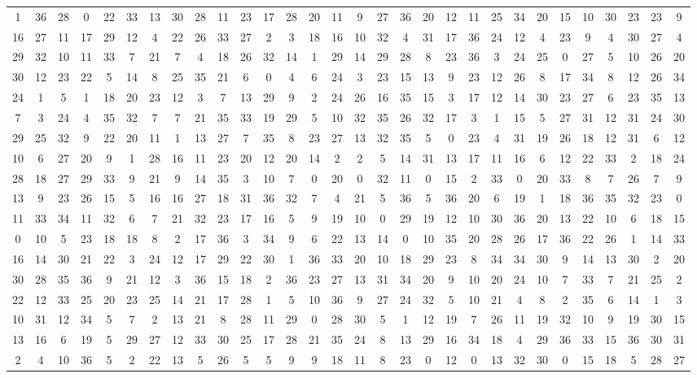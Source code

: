 \documentclass[11pt,twoside]{article}
\numberwithin{Theorem}{section}
\numberwithin{Definition}{section}
\numberwithin{Lemma}{section}
\numberwithin{Algorithm}{section}
\numberwithin{equation}{section}
\begin{document}
\begin{table}
\begin{tabular}{|*{30}{c|}}
1 &36 &28 &0 &22 &33 &13 &30 &28 &11 &23 &17 &28 &20 &11&9 &27 &36 &20 &12 &11 &25 &34 &20 &15 &10 &30 &23 &23 &9\\
16 &27 &11 &17 &29 &12 &4 &22 &26 &33 &27 &2 &3 &18 &16&10 &32 &4 &31 &17 &36 &24 &12 &4 &23 &9 &4 &30 &27 &4\\
29 &32 &10 &11 &33 &7 &21 &7 &4 &18 &26 &32 &14 &1 &29&14 &29 &28 &8 &23 &36 &3 &24 &25 &0 &27 &5 &10 &26 &20\\
30 &12 &23 &22 &5 &14 &8 &25 &35 &21 &6 &0 &4 &6 &24&3 &23 &15 &13 &9 &23 &12 &26 &8 &17 &34 &8 &12 &26 &34\\
24 &1 &5 &1 &18 &20 &23 &12 &3 &7 &13 &29 &9 &2 &24&26 &16 &35 &15 &3 &17 &12 &14 &30 &23 &27 &6 &23 &35 &13\\
7 &3 &24 &4 &35 &32 &7 &7 &21 &35 &33 &19 &29 &5 &10&32 &35 &26 &32 &17 &3 &1 &15 &5 &27 &31 &12 &31 &24 &30\\
29 &25 &32 &9 &22 &20 &11 &1 &13 &27 &7 &35 &8 &23 &27&13 &32 &35 &5 &0 &23 &4 &31 &19 &26 &18 &12 &31 &6 &12\\
10 &6 &27 &20 &9 &1 &28 &16 &11 &23 &20 &12 &20 &14 &2&2 &5 &14 &31 &13 &17 &11 &16 &6 &12 &22 &33 &2 &18 &24\\
28 &18 &27 &29 &33 &9 &21 &9 &14 &35 &3 &10 &7 &0 &20&0 &32 &11 &0 &15 &2 &33 &0 &20 &33 &8 &7 &26 &7 &9\\
13 &9 &23 &26 &15 &5 &16 &16 &27 &18 &31 &36 &32 &7 &4&21 &5 &36 &5 &36 &20 &6 &19 &1 &18 &36 &35 &32 &23 &0\\
11 &33 &34 &11 &32 &6 &7 &21 &32 &23 &17 &16 &5 &9 &19&10 &0 &29 &19 &12 &10 &30 &36 &20 &13 &22 &10 &6 &18 &15\\
0 &10 &5 &23 &18 &18 &8 &2 &17 &36 &3 &34 &9 &6 &22&13 &14 &0 &10 &35 &20 &28 &26 &17 &36 &22 &26 &1 &14 &33\\
16 &14 &30 &21 &22 &3 &24 &12 &17 &29 &22 &30 &1 &36 &33&20 &10 &18 &29 &23 &8 &34 &34 &30 &9 &14 &13 &30 &2 &20\\
30 &28 &35 &36 &9 &21 &12 &3 &36 &15 &18 &2 &36 &23 &27&13 &31 &34 &20 &9 &10 &20 &24 &10 &7 &33 &7 &21 &25 &2\\
22 &12 &33 &25 &20 &23 &25 &14 &21 &17 &28 &1 &5 &10 &36&9 &27 &24 &32 &5 &10 &21 &4 &8 &2 &35 &6 &14 &1 &3\\
10 &31 &12 &34 &5 &7 &2 &13 &21 &8 &28 &11 &29 &0 &28&30 &5 &1 &12 &19 &7 &26 &11 &19 &32 &10 &9 &19 &30 &15\\
13 &16 &6 &19 &5 &29 &27 &12 &33 &30 &25 &17 &28 &21 &35&24 &8 &13 &29 &16 &34 &18 &4 &29 &36 &33 &15 &36 &30 &31\\
2 &4 &10 &36 &5 &2 &22 &13 &5 &26 &5 &5 &9 &9 &18&11 &8 &23 &0 &12 &0 &13 &32 &30 &0 &15 &18 &5 &28 &27\\

\end{tabular}
\end{table}
\end{document}
